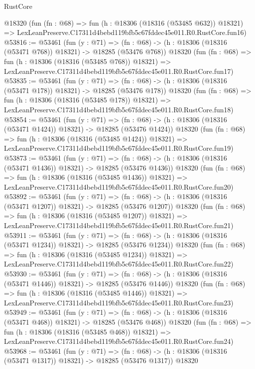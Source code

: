 \begin{lexlean}{RustCore}
\begin{coremodule}
    @18320
    (fun (fn : @68) =>
    fun (h : @18306 (@18316 (@53485 @632)) @18321) =>
    LexLeanPreserve.C17311d4bebd119bfb5c67fddec45e011.R0.RustCore.fun16)
@53816 := @53461
    (fun (y : @71) =>
    (fn : @68) -> (h : @18306 (@18316 (@53471 @768)) @18321) -> @18285 (@53476 @768))
    @18320
    (fun (fn : @68) =>
    fun (h : @18306 (@18316 (@53485 @768)) @18321) =>
    LexLeanPreserve.C17311d4bebd119bfb5c67fddec45e011.R0.RustCore.fun17)
@53835 := @53461
    (fun (y : @71) =>
    (fn : @68) -> (h : @18306 (@18316 (@53471 @178)) @18321) -> @18285 (@53476 @178))
    @18320
    (fun (fn : @68) =>
    fun (h : @18306 (@18316 (@53485 @178)) @18321) =>
    LexLeanPreserve.C17311d4bebd119bfb5c67fddec45e011.R0.RustCore.fun18)
@53854 := @53461
    (fun (y : @71) =>
    (fn : @68) -> (h : @18306 (@18316 (@53471 @1424)) @18321) -> @18285 (@53476 @1424))
    @18320
    (fun (fn : @68) =>
    fun (h : @18306 (@18316 (@53485 @1424)) @18321) =>
    LexLeanPreserve.C17311d4bebd119bfb5c67fddec45e011.R0.RustCore.fun19)
@53873 := @53461
    (fun (y : @71) =>
    (fn : @68) -> (h : @18306 (@18316 (@53471 @1436)) @18321) -> @18285 (@53476 @1436))
    @18320
    (fun (fn : @68) =>
    fun (h : @18306 (@18316 (@53485 @1436)) @18321) =>
    LexLeanPreserve.C17311d4bebd119bfb5c67fddec45e011.R0.RustCore.fun20)
@53892 := @53461
    (fun (y : @71) =>
    (fn : @68) -> (h : @18306 (@18316 (@53471 @1207)) @18321) -> @18285 (@53476 @1207))
    @18320
    (fun (fn : @68) =>
    fun (h : @18306 (@18316 (@53485 @1207)) @18321) =>
    LexLeanPreserve.C17311d4bebd119bfb5c67fddec45e011.R0.RustCore.fun21)
@53911 := @53461
    (fun (y : @71) =>
    (fn : @68) -> (h : @18306 (@18316 (@53471 @1234)) @18321) -> @18285 (@53476 @1234))
    @18320
    (fun (fn : @68) =>
    fun (h : @18306 (@18316 (@53485 @1234)) @18321) =>
    LexLeanPreserve.C17311d4bebd119bfb5c67fddec45e011.R0.RustCore.fun22)
@53930 := @53461
    (fun (y : @71) =>
    (fn : @68) -> (h : @18306 (@18316 (@53471 @1446)) @18321) -> @18285 (@53476 @1446))
    @18320
    (fun (fn : @68) =>
    fun (h : @18306 (@18316 (@53485 @1446)) @18321) =>
    LexLeanPreserve.C17311d4bebd119bfb5c67fddec45e011.R0.RustCore.fun23)
@53949 := @53461
    (fun (y : @71) =>
    (fn : @68) -> (h : @18306 (@18316 (@53471 @468)) @18321) -> @18285 (@53476 @468))
    @18320
    (fun (fn : @68) =>
    fun (h : @18306 (@18316 (@53485 @468)) @18321) =>
    LexLeanPreserve.C17311d4bebd119bfb5c67fddec45e011.R0.RustCore.fun24)
@53968 := @53461
    (fun (y : @71) =>
    (fn : @68) -> (h : @18306 (@18316 (@53471 @1317)) @18321) -> @18285 (@53476 @1317))
    @18320

\end{coremodule}
\end{lexlean}
